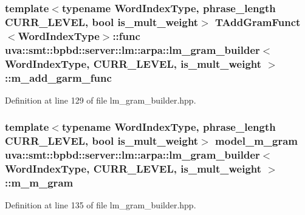 \subsubsection[{m\+\_\+add\+\_\+garm\+\_\+func}]{\setlength{\rightskip}{0pt plus 5cm}template$<$typename Word\+Index\+Type, phrase\+\_\+length C\+U\+R\+R\+\_\+\+L\+E\+V\+E\+L, bool is\+\_\+mult\+\_\+weight$>$ {\bf T\+Add\+Gram\+Funct}$<$Word\+Index\+Type$>$\+::func {\bf uva\+::smt\+::bpbd\+::server\+::lm\+::arpa\+::lm\+\_\+gram\+\_\+builder}$<$ Word\+Index\+Type, C\+U\+R\+R\+\_\+\+L\+E\+V\+E\+L, is\+\_\+mult\+\_\+weight $>$\+::m\+\_\+add\+\_\+garm\+\_\+func\hspace{0.3cm}{\ttfamily [protected]}}\label{classuva_1_1smt_1_1bpbd_1_1server_1_1lm_1_1arpa_1_1lm__gram__builder_a9773e2b8af83ad5744bc9efbf3726770}


Definition at line 129 of file lm\+\_\+gram\+\_\+builder.\+hpp.

\hypertarget{classuva_1_1smt_1_1bpbd_1_1server_1_1lm_1_1arpa_1_1lm__gram__builder_a2b1b788450d31a1f2f0a6e89c28c6a1f}{}
\subsubsection[{m\+\_\+m\+\_\+gram}]{\setlength{\rightskip}{0pt plus 5cm}template$<$typename Word\+Index\+Type, phrase\+\_\+length C\+U\+R\+R\+\_\+\+L\+E\+V\+E\+L, bool is\+\_\+mult\+\_\+weight$>$ {\bf model\+\_\+m\+\_\+gram} {\bf uva\+::smt\+::bpbd\+::server\+::lm\+::arpa\+::lm\+\_\+gram\+\_\+builder}$<$ Word\+Index\+Type, C\+U\+R\+R\+\_\+\+L\+E\+V\+E\+L, is\+\_\+mult\+\_\+weight $>$\+::m\+\_\+m\+\_\+gram\hspace{0.3cm}{\ttfamily [protected]}}\label{classuva_1_1smt_1_1bpbd_1_1server_1_1lm_1_1arpa_1_1lm__gram__builder_a2b1b788450d31a1f2f0a6e89c28c6a1f}


Definition at line 135 of file lm\+\_\+gram\+\_\+builder.\+hpp.

\hypertarget{classuva_1_1smt_1_1bpbd_1_1server_1_1lm_1_1arpa_1_1lm__gram__builder_ae9e727cf174b8d61d1e9f88ac30a50e5}{}
